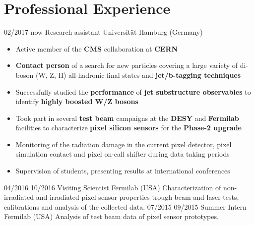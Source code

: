   \section{Professional Experience}
    \position
      {02/2017 \textemdash{} now}
      {Research assistant}
      {Universit\"{a}t Hamburg (Germany)}
      {\begin{itemize}
\item Active member of the {\bf CMS} collaboration at {\bf CERN}
\item {\bf Contact person} of a search for new particles covering a large variety of di-boson (W, Z, H) all-hadronic final states and {\bf  jet/b-tagging techniques}
\item Successfully studied the {\bf performance} of {\bf jet substructure observables} to identify {\bf highly boosted W/Z bosons}
\item Took part in several {\bf test beam} campaigns at the {\bf DESY} and {\bf Fermilab} facilities to characterize {\bf pixel silicon sensors} for the {\bf Phase-2 upgrade}
\item Monitoring of the radiation damage in the current pixel detector, pixel simulation contact and pixel on-call shifter during data taking periods
\item Supervision of students, presenting results at international conferences
\end{itemize}
}
    \position
      {04/2016 \textemdash{} 10/2016}
      {Visiting Scientist}
      {Fermilab (USA)}
      {Characterization of non-irradiated and irradiated pixel sensor properties trough beam and laser tests, calibrations and analysis of the collected data.}
    \position
      {07/2015 \textemdash{} 09/2015}
      {Summer Intern}
      {Fermilab (USA)}
      {Analysis of test beam data of pixel sensor prototypes.}
\fi
